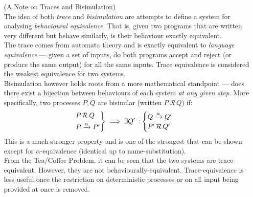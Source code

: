     \begin{remark*}{(A Note on Traces and Bisimulation)\\}
        The idea of both \textit{trace} and \textit{bisimulation} are attempts to define a system for analysing \textit{behavioural equivalence}.
        That is, given two programs that are written very different but behave similarly, is their behaviour exactly equivalent. \\

        The trace comes from automata theory and is exactly equivalent to \textit{language equivalence} --- given a set of inputs, do both programs accept and reject (or produce the same output) for all the same inputs.
        Trace equivalence is considered the weakest equivalence for two systems. \\

        Bisimulation however holds roots from a more mathematical standpoint --- does there exist a bijection between behaviours of each system \textit{at any given step}.
        More specifically, two processes $P, Q$ are bisimilar (written $P \, \mathcal{R} \, Q$) if:
        \begin{equation*}
            \begin{rcases}
                P \, \mathcal{R} \, Q \\
                P \xrightarrow{\alpha} P' \\
            \end{rcases} \implies \exists Q' \, :
            \begin{cases}
                Q \xrightarrow{\alpha} Q' \\
                P' \, \mathcal{R} \, Q' \\
            \end{cases}
        \end{equation*}
        This is a much stronger property and is one of the strongest that can be shown except for $\alpha$-equivalence (identical up to name-substitution). \\
        
        From the Tea/Coffee Problem, it can be seen that the two systems are trace-equivalent.
        However, they are not behaviourally-equivalent.
        Trace-equivalence is less useful once the restriction on deterministic processes or on all input being provided at once is removed.
    \end{remark*}


